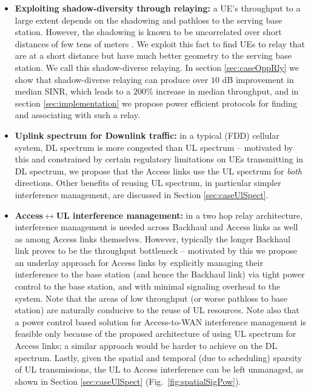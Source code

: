 \documentclass[journal]{IEEEtran}
\begin{document}
\begin{itemize}
    \item {\bf Exploiting shadow-diversity through relaying:} a UE's throughput to a large extent depends on the shadowing and pathloss to the serving base station. However, the shadowing is known to be uncorrelated over short distances of few tens of meters \cite[Sec.~B.1.2.1.1]{3GPP36814}\cite{Gudmundson91}. We exploit this fact to find UEs to relay that are at a short distance but have much better geometry to the serving base station.  We call this shadow-diverse relaying. In section \ref{sec:caseOppRly} we show that shadow-diverse relaying can produce over $10$ dB improvement in median SINR, which leads to a $200$\% increase in median throughput, and in section \ref{sec:implementation} we propose power efficient protocols for finding and associating with such a relay.
    \item {\bf Uplink spectrum for Downlink traffic:} in a typical (FDD) cellular system, DL spectrum is more congested than UL spectrum -- motivated by this and constrained by certain regulatory limitations on UEs transmitting in DL spectrum, we propose that the Access links use the UL spectrum for {\em both} directions. Other benefits of reusing UL spectrum, in particular simpler interference management, are discussed in Section \ref{sec:caseUlSpect}.
    \item {\bf Access$\leftrightarrow$UL interference management:} in a two hop relay architecture, interference management is needed across Backhaul and Access links as well as among Access links themselves.  However, typically the longer Backhaul link proves to be the throughput bottleneck -- motivated by this we propose an underlay approach for Access links by explicitly managing their interference to the base station (and hence the Backhaul link) via tight power control to the base station, and with minimal signaling overhead to the system.  Note that the areas of low throughput (or worse pathloss to base station) are naturally conducive to the reuse of UL resources.  Note also that a power control based solution for Access-to-WAN interference management is feasible only because of the proposed architecture of using UL spectrum for Access links; a similar approach would be harder to achieve on the DL spectrum.  Lastly, given the spatial and temporal (due to scheduling) sparsity of UL transmissions, the UL to Access interference can be left unmanaged, as shown in  Section \ref{sec:caseUlSpect} (Fig.~\ref{fig:spatialSigPow}).
\end{itemize}
\end{document}
